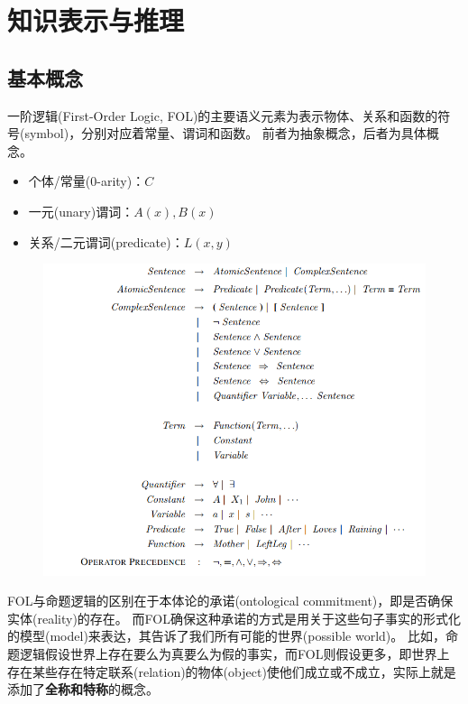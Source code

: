 
\section{知识表示与推理}

\subsection{基本概念}
一阶逻辑(First-Order Logic, FOL)的主要语义元素为表示物体、关系和函数的符号(symbol)，分别对应着常量、谓词和函数。
前者为抽象概念，后者为具体概念。
\begin{itemize}
	\item 个体/常量(0-arity)：$C$
	\item 一元(unary)谓词：$A(x),B(x)$
	\item 关系/二元谓词(predicate)：$L(x,y)$
\end{itemize}
\begin{figure}[H]
\centering
\includegraphics[width=0.7\linewidth]{fig/FOL.png}
\end{figure}

FOL与命题逻辑的区别在于本体论的承诺(ontological commitment)，即是否确保实体(reality)的存在。
而FOL确保这种承诺的方式是用关于这些句子事实的形式化的模型(model)来表达，其告诉了我们所有可能的世界(possible world)。
比如，命题逻辑假设世界上存在要么为真要么为假的事实，而FOL则假设更多，即世界上存在某些存在特定联系(relation)的物体(object)使他们成立或不成立，实际上就是添加了\textbf{全称和特称}的概念。


